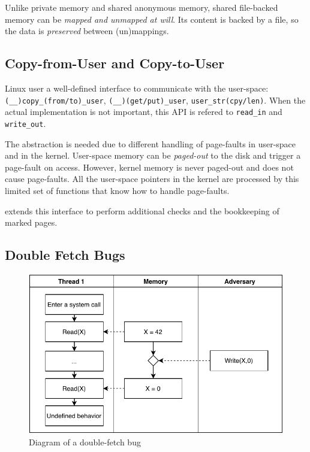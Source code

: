 Unlike private memory and shared anonymous memory, shared file-backed memory can
be \emph{mapped and unmapped at will}. Its content is backed by a file, so the
data is \emph{preserved} between (un)mappings.

\subsection{Copy-from-User and Copy-to-User}
\label{subsec:copy}

Linux user a well-defined interface to communicate with the user-space:
\texttt{(\_\_)copy\_(from/to)\_user}, \texttt{(\_\_)(get/put)\_user},
\texttt{user\_str(cpy/len)}. When the actual implementation is not important,
this API is refered to \texttt{read\_in} and \texttt{write\_out}.

The abstraction is needed due to different handling of page-faults in user-space
and in the kernel. User-space memory can be \emph{paged-out} to the disk and
trigger a page-fault on access. However, kernel memory is never paged-out and
does not cause page-faults. All the user-space pointers in the kernel are
processed by this limited set of functions that know how to handle page-faults.

\sysname extends this interface to perform additional checks and the bookkeeping
of marked pages.

\subsection{Double Fetch Bugs}
\label{subsec:doublefetch}

\begin{figure}[]
  \centering
  \includegraphics[width=.85\linewidth]{img/doublefetch.pdf}
  \caption{Diagram of a double-fetch bug}
  \label{fig:doublefetch}
\end{figure}


